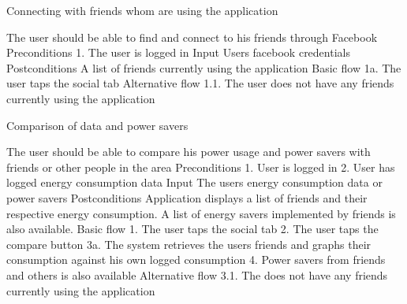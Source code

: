 Connecting with friends whom are using the application

The user should be able to find and connect to his friends through Facebook
Preconditions
1. The user is logged in
Input
Users facebook credentials
Postconditions
A list of friends currently using the application
Basic flow
1a. The user taps the social tab
Alternative flow
1.1. The user does not have any friends currently using the application



Comparison of data and power savers

The user should be able to compare his power usage and power savers with friends or other people in the area
Preconditions
1. User is logged in
2. User has logged energy consumption data
Input
The users energy consumption data or power savers
Postconditions
Application displays a list of friends and their respective energy consumption. A list of energy savers implemented by friends is also available. 
Basic flow
1. The user taps the social tab
2. The user taps the compare button
3a. The system retrieves the users friends and graphs their consumption against his own logged consumption
4. Power savers from friends and others is also available
Alternative flow
3.1. The does not have any friends currently using the application


